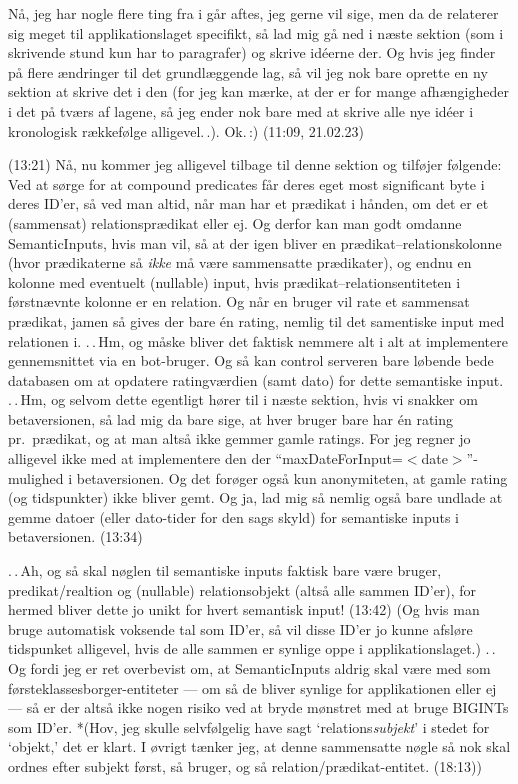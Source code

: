 \documentclass{report}
\begin{document}
Nå, jeg har nogle flere ting fra i går aftes, jeg gerne vil sige, men da de relaterer sig meget til applikationslaget specifikt, så lad mig gå ned i næste sektion (som i skrivende stund kun har to paragrafer) og skrive idéerne der. Og hvis jeg finder på flere ændringer til det grundlæggende lag, så vil jeg nok bare oprette en ny sektion at skrive det i den (for jeg kan mærke, at der er for mange afhængigheder i det på tværs af lagene, så jeg ender nok bare med at skrive alle nye idéer i kronologisk rækkefølge alligevel.\,.). Ok.\,:) (11:09, 21.02.23)

(13:21) Nå, nu kommer jeg alligevel tilbage til denne sektion og tilføjer følgende: Ved at sørge for at compound predicates får deres eget most significant byte i deres ID'er, så ved man altid, når man har et prædikat i hånden, om det er et (sammensat) relationsprædikat eller ej. Og derfor kan man godt omdanne SemanticInputs, hvis man vil, så at der igen bliver en prædikat--relationskolonne (hvor prædikaterne så \emph{ikke} må være sammensatte prædikater), og endnu en kolonne med eventuelt (nullable) input, hvis prædikat--relationsentiteten i førstnævnte kolonne er en relation. Og når en bruger vil rate et sammensat prædikat, jamen så gives der bare én rating, nemlig til det samentiske input med relationen i. .\,.\,Hm, og måske bliver det faktisk nemmere alt i alt at implementere gennemsnittet via en bot-bruger. Og så kan control serveren bare løbende bede databasen om at opdatere ratingværdien (samt dato) for dette semantiske input. .\,.\,Hm, og selvom dette egentligt hører til i næste sektion, hvis vi snakker om betaversionen, så lad mig da bare sige, at hver bruger bare har én rating pr.\ prædikat, og at man altså ikke gemmer gamle ratings. For jeg regner jo alligevel ikke med at implementere den der ``maxDateForInput=$<$date$>$''-mulighed i betaversionen. Og det forøger også kun anonymiteten, at gamle rating (og tidspunkter) ikke bliver gemt. Og ja, lad mig så nemlig også bare undlade at gemme datoer (eller dato-tider for den sags skyld) for semantiske inputs i betaversionen. (13:34)

.\,.\,Ah, og så skal nøglen til semantiske inputs faktisk bare være bruger, predikat/realtion og (nullable) relationsobjekt (altså alle sammen ID'er), for hermed bliver dette jo unikt for hvert semantisk input! (13:42) (Og hvis man bruge automatisk voksende tal som ID'er, så vil disse ID'er jo kunne afsløre tidspunket alligevel, hvis de alle sammen er synlige oppe i applikationslaget.) .\,.\,Og fordi jeg er ret overbevist om, at SemanticInputs aldrig skal være med som førsteklassesborger-entiteter --- om så de bliver synlige for applikationen eller ej --- så er der altså ikke nogen risiko ved at bryde mønstret med at bruge BIGINTs som ID'er. *(Hov, jeg skulle selvfølgelig have sagt `relations\emph{subjekt}' i stedet for `objekt,' det er klart. I øvrigt tænker jeg, at denne sammensatte nøgle så nok skal ordnes efter subjekt først, så bruger, og så relation/prædikat-entitet. (18:13)) 
\end{document}

